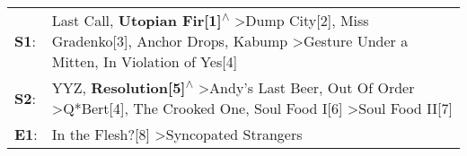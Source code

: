 \begin{supertabular}{p{0.03\textwidth}p{0.92\textwidth}}
 \textbf{S1}:  &  Last Call\textsuperscript{}, \enspace \textbf{Utopian Fir[1]\textsuperscript{$\wedge$}} \textgreater \enspace Dump City[2]\textsuperscript{}, \enspace Miss Gradenko[3]\textsuperscript{}, \enspace Anchor Drops\textsuperscript{}, \enspace Kabump\textsuperscript{} \textgreater \enspace Gesture Under a Mitten\textsuperscript{}, \enspace In Violation of Yes[4]\textsuperscript{}  \enspace  \\
 \textbf{S2}:  &      YYZ\textsuperscript{}, \enspace \textbf{Resolution[5]\textsuperscript{$\wedge$}} \textgreater \enspace Andy's Last Beer\textsuperscript{}, \enspace Out Of Order\textsuperscript{} \textgreater \enspace Q*Bert[4]\textsuperscript{}, \enspace The Crooked One\textsuperscript{}, \enspace Soul Food I[6]\textsuperscript{} \textgreater \enspace Soul Food II[7]\textsuperscript{}  \enspace  \\
 \textbf{E1}:  &                                                                                                                                                                                                                                                                                          In the Flesh?[8]\textsuperscript{} \textgreater \enspace Syncopated Strangers\textsuperscript{}  \enspace  \\
\end{supertabular}

